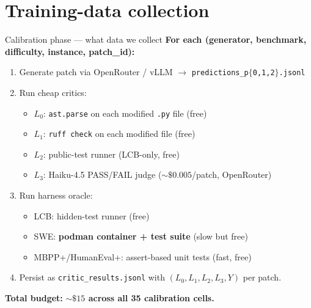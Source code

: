 \documentclass[10pt]{beamer}
\newcommand{\good}[1]{\textcolor{accentGreen}{\textbf{#1}}}
\newcommand{\warn}[1]{\textcolor{accentOrange}{\textbf{#1}}}
\newcommand{\info}[1]{\textcolor{primaryBlue}{\textbf{#1}}}
\begin{document}

\section{Training-data collection}
\hypertarget{out:7}{}

\begin{frame}{Calibration phase --- what data we collect}
\vspace{0.2cm}
\info{For each (generator, benchmark, difficulty, instance, patch\_id):}
\begin{enumerate}
\item Generate patch via OpenRouter / vLLM
  $\to$ \texttt{predictions\_p$\{$0,1,2$\}$.jsonl}
\item Run cheap critics:
  \begin{itemize}
  \item \textcolor{accentGreen}{$L_0$:} \texttt{ast.parse} on each modified \texttt{.py} file (free)
  \item \textcolor{accentGreen}{$L_1$:} \texttt{ruff check} on each modified file (free)
  \item \textcolor{accentTeal}{$L_2$:} public-test runner (LCB-only, free)
  \item \textcolor{accentPurple}{$L_3$:} Haiku-4.5 PASS/FAIL judge ($\sim\$0.005$/patch, OpenRouter)
  \end{itemize}
\item Run harness oracle:
  \begin{itemize}
  \item LCB: hidden-test runner (free)
  \item SWE: \warn{podman container + test suite} (slow but free)
  \item MBPP+/HumanEval+: assert-based unit tests (fast, free)
  \end{itemize}
\item Persist as \texttt{critic\_results.jsonl} with $(L_0, L_1, L_2, L_3, Y)$
  per patch.
\end{enumerate}
\info{Total budget:} \good{${\sim}\$15$ across all 35 calibration cells.}
\end{frame}
\end{document}

